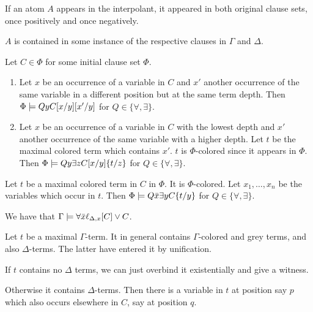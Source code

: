 \documentclass[,%
	paper=a4,%
	DIV14, 
	liststotoc,
	bibtotoc,
	draft=false,%
	numbers=noendperiod
]{scrartcl}
\begin{document}
\begin{lemma}
	\label{lemma:interpolant_atom_origin}
	If an atom $A$ appears in the interpolant, it appeared in both original clause sets, once positively and once negatively.

	$A$ is contained in some instance of the respective clauses in $\Gamma$ and $\Delta$.

\end{lemma}

\begin{lemma}
	Let $C \in \Phi$ for some initial clause set $\Phi$. 
	\begin{enumerate}
			\item
				Let $x$ be an occurrence of a variable in $C$ and $x'$ another occurrence of the same variable in a different position but at the same term depth.
				Then $\Phi \models Q y C[x/y][x'/y]$ for $Q \in \{\forall, \exists\}$.

			\item
				Let $x$ be an occurrence of a variable in $C$ with the lowest depth and $x'$ another occurrence of the same variable with a higher depth.
				Let $t$ be the maximal colored term which contains $x'$. $t$ is $\Phi$-colored since it appears in $\Phi$.
				Then $\Phi \models Q y \exists z C[x/y]\{t/z\}$ for $Q \in \{\forall, \exists\}$.
	\end{enumerate}
\end{lemma}

\begin{lemma}

	Let $t$ be a maximal colored term in $C$ in $\Phi$. It is $\Phi$-colored.
	Let $x_1, \ldots, x_n$ be the variables which occur in $t$.
	Then $\Phi \models Q \bar x \exists y C\{t/y\}$ for $Q \in \{\forall, \exists\}$.

\end{lemma}

\clearpage

	We have that $\Gamma \models \forall \bar x \ell_{\Delta,x}[C] \lor C$.
	\bigskip

	Let $t$ be a maximal $\Gamma$-term.
	It in general contains $\Gamma$-colored and grey terms, and also $\Delta$-terms.
	The latter have entered it by unification.

	If $t$ contains no $\Delta$ terms, we can just overbind it existentially and give a witness.

	Otherwise it contains $\Delta$-terms.
	Then there is a variable in $t$ at position say $p$ which also occurs elsewhere in $C$, say at position $q$.
\end{document}
